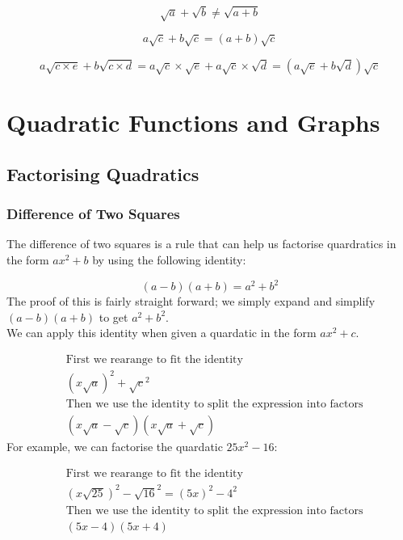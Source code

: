 \documentclass{article}
\begin{document}
\begin{equation}
	\label{bad_add}
	\sqrt{a} + \sqrt{b} \ne \sqrt{a + b}
\end{equation}

\begin{equation}
	\label{simple_surd_add}
	a\sqrt{c} + b\sqrt{c} = (a + b)\sqrt{c}
\end{equation}

\begin{equation}
	\label{surd_add}
	a\sqrt{c \times e} + b\sqrt{c \times d} = a\sqrt{c} \times \sqrt{e} + a\sqrt{c} \times \sqrt{d}
	 = (a\sqrt{e} + b\sqrt{d})\sqrt{c}
\end{equation}

\section{Quadratic Functions and Graphs}

\subsection{Factorising Quadratics}

\subsubsection{Difference of Two Squares}
The difference of two squares is a rule that can help us
factorise quardratics in the form $ax^2 + b$ by using the
following identity:

\begin{equation}
	(a - b)(a + b) = a^2 + b^2
\end{equation}
The proof of this is fairly straight forward; we simply expand and simplify $(a - b)(a + b)$ to get $a^2 + b^2$.
\\
We can apply this identity when given a quardatic in the form $ax^2 + c$.

\begin{align*}
	&\text{First we rearange to fit the identity}\\
	&(x\sqrt{a})^2 + \sqrt{c}^2\\
	&\text{Then we use the identity to split the expression into factors}\\
	&(x\sqrt{a} - \sqrt{c})(x\sqrt{a} + \sqrt{c})
\end{align*}
For example, we can factorise the quardatic $25x^2 - 16$:

\begin{align*}
	&\text{First we rearange to fit the identity}\\
	&(x\sqrt{25})^2 - \sqrt{16}^2 = (5x)^2 - 4^2\\
	&\text{Then we use the identity to split the expression into factors}\\
	&(5x - 4)(5x + 4)
\end{align*}
\end{document}
